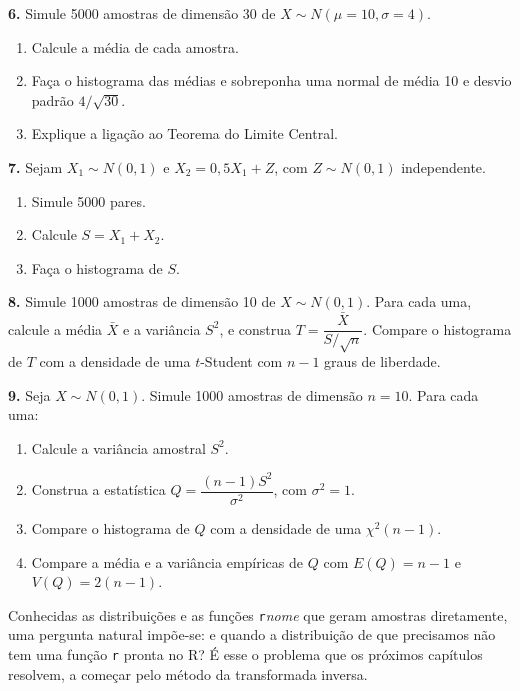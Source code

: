 \documentclass[
  portuguese,
  11pt,
  openany]{book}
\providecommand{\tightlist}{%
  \setlength{\itemsep}{0pt}\setlength{\parskip}{0pt}}
\begin{document}
\textbf{6.} Simule 5000 amostras de dimensão 30 de \(X \sim N(\mu = 10, \sigma = 4)\).

\begin{enumerate}
\def\labelenumi{(\alph{enumi})}
\tightlist
\item
  Calcule a média de cada amostra.
\item
  Faça o histograma das médias e sobreponha uma normal de média 10 e desvio padrão
  \(4/\sqrt{30}\).
\item
  Explique a ligação ao Teorema do Limite Central.
\end{enumerate}

\textbf{7.} Sejam \(X_1 \sim N(0, 1)\) e \(X_2 = 0{,}5 X_1 + Z\), com \(Z \sim N(0, 1)\)
independente.

\begin{enumerate}
\def\labelenumi{(\alph{enumi})}
\tightlist
\item
  Simule 5000 pares.
\item
  Calcule \(S = X_1 + X_2\).
\item
  Faça o histograma de \(S\).
\end{enumerate}

\textbf{8.} Simule 1000 amostras de dimensão 10 de \(X \sim N(0, 1)\). Para cada uma, calcule a
média \(\bar{X}\) e a variância \(S^2\), e construa
\(T = \dfrac{\bar{X}}{S / \sqrt{n}}\). Compare o histograma de \(T\) com a densidade de uma
\(t\)-Student com \(n - 1\) graus de liberdade.

\textbf{9.} Seja \(X \sim N(0, 1)\). Simule 1000 amostras de dimensão \(n = 10\). Para cada uma:

\begin{enumerate}
\def\labelenumi{(\alph{enumi})}
\tightlist
\item
  Calcule a variância amostral \(S^2\).
\item
  Construa a estatística \(Q = \dfrac{(n-1)S^2}{\sigma^2}\), com \(\sigma^2 = 1\).
\item
  Compare o histograma de \(Q\) com a densidade de uma \(\chi^2(n-1)\).
\item
  Compare a média e a variância empíricas de \(Q\) com \(E(Q) = n - 1\) e \(V(Q) = 2(n-1)\).
\end{enumerate}

Conhecidas as distribuições e as funções \texttt{r}\emph{nome} que geram amostras diretamente, uma
pergunta natural impõe-se: e quando a distribuição de que precisamos não tem uma função
\texttt{r} pronta no R? É esse o problema que os próximos capítulos resolvem, a começar pelo
método da transformada inversa.
\end{document}
